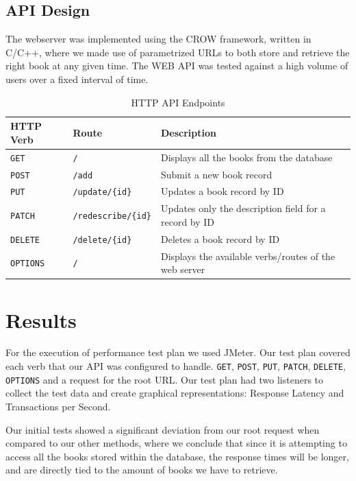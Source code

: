 \documentclass[a4paper, 12pt]{article}
\begin{document}
\subsection{API Design}
\par The webserver was implemented using the CROW framework, written in C/C++, where we made use of parametrized
URLs to both store and retrieve the right book at any given time. The WEB API was tested against a high volume of users
over a fixed interval of time.

\begin{table}[H]
    \centering
    \begin{tabular}{|l|l|l|}
        \hline
        \textbf{HTTP Verb} & \textbf{Route} & \textbf{Description} \\
        \hline
        \texttt{GET} & \texttt{/} & Displays all the books from the database \\
        \texttt{POST} & \texttt{/add} & Submit a new book record \\
        \texttt{PUT} & \texttt{/update/\{id\}} & Updates a book record by ID \\
        \texttt{PATCH} & \texttt{/redescribe/\{id\}} & Updates only the description field for a record by ID \\
        \texttt{DELETE} & \texttt{/delete/\{id\}} & Deletes a book record by ID \\
        \texttt{OPTIONS} & \texttt{/} & Displays the available verbs/routes of the web server \\
        \hline
    \end{tabular}
    \caption{HTTP API Endpoints}
\end{table}

\section{Results}

\par For the execution of performance test plan we used JMeter. Our test plan covered each verb that our API was configured to handle. \texttt{GET}, \texttt{POST}, \texttt{PUT}, \texttt{PATCH}, \texttt{DELETE}, \texttt{OPTIONS} and a request for the root URL.
Our test plan had two listeners to collect the test data and create graphical representations: Response Latency and Transactions per Second.

\par Our initial tests showed a significant deviation from our root request when compared to our other methods, where we conclude that since it is attempting to
access all the books stored within the database, the response times will be longer, and are directly tied to the amount of books we have to retrieve.
\end{document}
